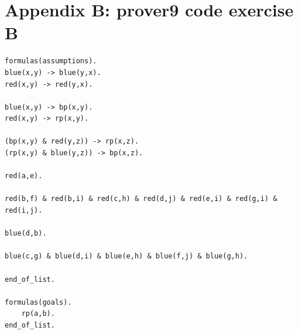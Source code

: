 \documentclass[12pt]{article}
\begin{document}
\clearpage{}

\section*{Appendix B: prover9 code exercise B}
\begin{verbatim}
formulas(assumptions).
blue(x,y) -> blue(y,x).
red(x,y) -> red(y,x).
	
blue(x,y) -> bp(x,y).
red(x,y) -> rp(x,y).

(bp(x,y) & red(y,z)) -> rp(x,z).
(rp(x,y) & blue(y,z)) -> bp(x,z).

red(a,e).

red(b,f) & red(b,i) & red(c,h) & red(d,j) & red(e,i) & red(g,i) & red(i,j).

blue(d,b).

blue(c,g) & blue(d,i) & blue(e,h) & blue(f,j) & blue(g,h).
	
end_of_list.

formulas(goals).
	rp(a,b).
end_of_list.
\end{verbatim}




%
\end{document}

